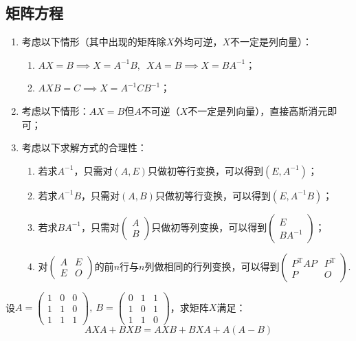 \subsection{矩阵方程}
\begin{enumerate}
    \item 考虑以下情形（其中出现的矩阵除$X$外均可逆，$X$不一定是列向量）：
    \begin{enumerate}[label=(\arabic*)]
        \item $AX=B \implies X=A^{-1}B, \enspace XA=B \implies X=BA^{-1}$；
        \item $AXB=C \implies X=A^{-1}CB^{-1}$；
    \end{enumerate}
    \item 考虑以下情形：$AX=B$但$A$不可逆（$X$不一定是列向量），直接高斯消元即可；
    \item 考虑以下求解方式的合理性：
    \begin{enumerate}[label=(\arabic*)]
        \item 若求$A^{-1}$，只需对$(A,E)$只做初等行变换，可以得到$(E,A^{-1})$；
        \item 若求$A^{-1}B$，只需对$(A,B)$只做初等行变换，可以得到$(E,A^{-1}B)$；
        \item 若求$BA^{-1}$，只需对$\begin{pmatrix}
            A \\ B
        \end{pmatrix}$只做初等列变换，可以得到$\begin{pmatrix}
            E \\ BA^{-1}
        \end{pmatrix}$；
        \item 对$\begin{pmatrix}
            A & E \\ E & O
        \end{pmatrix}$的前$n$行与$n$列做相同的行列变换，可以得到$\begin{pmatrix}
            P^\mathrm{T}AP & P^\mathrm{T} \\ P & O
        \end{pmatrix}$.
    \end{enumerate}
\end{enumerate}

\begin{example}
    设$A=\begin{pmatrix}1 & 0 & 0 \\ 1 & 1 & 0 \\ 1 & 1 & 1\end{pmatrix},\
    B=\begin{pmatrix}0 & 1 & 1 \\ 1 & 0 & 1 \\ 1 & 1 & 0\end{pmatrix}$，求矩阵$X$满足：
    \[AXA+BXB=AXB+BXA+A(A-B)\]
\end{example}

